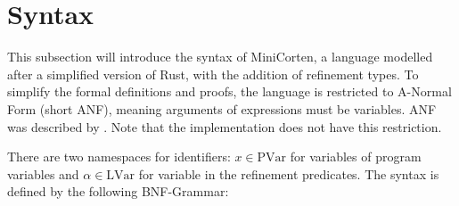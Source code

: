 \documentclass[twoside, english]{sdqthesis}
\theoremstyle{definition}
\begin{document}
\section{Syntax}

This subsection will introduce the syntax of MiniCorten, a language modelled after a simplified version of Rust, with the addition of refinement types.
To simplify the formal definitions and proofs, the language is restricted to A-Normal Form (short ANF), meaning arguments of expressions must be variables. ANF was described by \cite{sabry_reasoning_1993}. Note that the implementation does not have this restriction.

There are two namespaces for identifiers: $x \in \text{PVar}$ for variables of program variables and $\alpha \in \text{LVar}$ for variable in the refinement predicates. The syntax is defined by the following BNF-Grammar:
\end{document}
